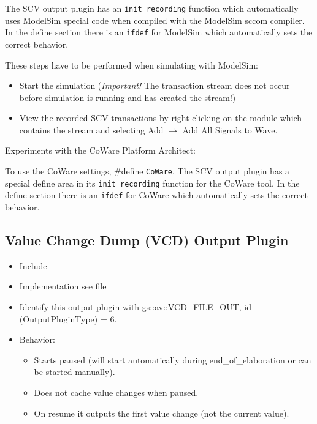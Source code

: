 The SCV output plugin has an \lstinline|init_recording| function which automatically uses ModelSim special code when compiled with the ModelSim sccom compiler. In the define section there is an \lstinline|ifdef| for ModelSim which automatically sets the correct behavior.
  
These steps have to be performed when simulating with ModelSim:
\begin{itemize}
  \item Start the simulation ({\em Important!} The transaction stream does not occur before simulation is running and has created the stream!)
  \item View the recorded SCV transactions by right clicking on the module which contains the stream and selecting {\sffamily Add $\rightarrow$ Add All Signals to Wave}. %
\end{itemize}


Experiments with the {\sffamily CoWare Platform Architect}:

To use the CoWare settings, \#define \lstinline|CoWare|. The SCV output plugin has a special define area in its \lstinline|init_recording| function for the CoWare tool. In the define section there is an \lstinline|ifdef| for CoWare which automatically sets the correct behavior.


\subsection{Value Change Dump (VCD) Output Plugin}
\label{GAVOPvcd}

\begin{itemize}
  \item Include 
  \item Implementation see file 
  \item Identify this output plugin with {\sffamily gs::av::VCD\_FILE\_OUT}, \newline
           id ({\sffamily OutputPluginType}) = 6.
  \item Behavior:
    \begin{itemize}
        \item Starts paused (will start automatically during end\_of\_elaboration or can be started manually).
        \item Does not cache value changes when paused.
        \item On resume it outputs the first value change (not the current value).
    \end{itemize}
\end{itemize}

